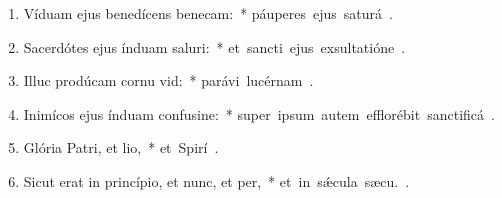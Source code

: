 \begin{flushleft}
\begin{enumerate}[leftmargin=*]
\item Víduam ejus benedícens benecam:~* \mbox{páuperes ejus saturá .}
\item Sacerdótes ejus índuam saluri:~* \mbox{et sancti ejus exsultatióne .}
\item Illuc prodúcam cornu vid:~* \mbox{parávi lucérnam  .}
\item Inimícos ejus índuam confusine:~* \mbox{super ipsum autem efflorébit sanctificá .}
\item Glória Patri, et lio,~* \mbox{et Spirí .}
\item Sicut erat in princípio, et nunc, et per,~* \mbox{et in s\'{\ae}cula sæcu. .}

\end{enumerate}
\end{flushleft}


